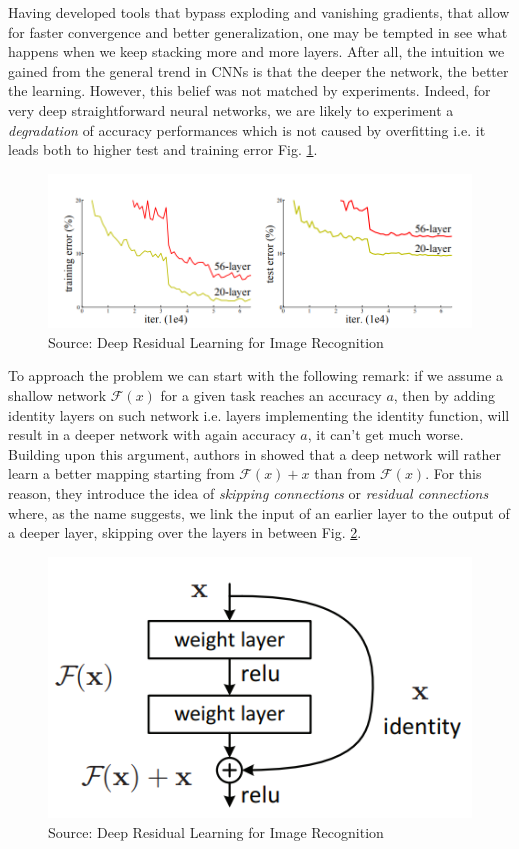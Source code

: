 \documentclass[LaM,binding=0.6cm]{./packages/sapthesis/sapthesis}
\begin{document}
        Having developed tools that bypass exploding and vanishing gradients, that allow for faster convergence
        and better generalization, one may be tempted in see what happens when we keep stacking more and more layers.
        After all, the intuition we gained from the general trend in CNNs is that the deeper the network, the better
        the learning. However, this belief was not matched by experiments. Indeed, for very deep 
        straightforward neural networks, we are likely to experiment a \textit{degradation} \cite{resnet} of accuracy performances
        which is not caused by overfitting i.e. it leads both to higher test and training error Fig. \ref{fig:degradation}.
        \begin{figure}[h]
            \centering
            \includegraphics[scale=0.35]{degradation}
            \caption{Source: Deep Residual Learning for Image Recognition}
            \label{fig:degradation}
        \end{figure}
        To approach the problem we can start with the following remark: if we assume a shallow
        network $ \mathcal{F} (x) $ for a given task reaches an accuracy $a$, then by adding identity layers on such network i.e. layers implementing the identity function,
        will result in a deeper network with again accuracy $a$, it can't get much worse.
        Building upon this argument, authors in \cite{resnet} showed that a deep network will rather
        learn a better mapping starting from $ \mathcal{F} (x) + x $ than from $ \mathcal{F} (x) $. 
        For this reason, they introduce the idea of \textit{skipping connections} or \textit{residual connections} where, 
        as the name suggests, we link the input of an earlier layer to the output of a deeper layer, skipping
        over the layers in between Fig. \ref{fig:residual}.
        \begin{figure}[h]
            \centering
            \includegraphics[scale=0.35]{residual}
            \caption{Source: Deep Residual Learning for Image Recognition}
            \label{fig:residual}
        \end{figure} 
\end{document}

